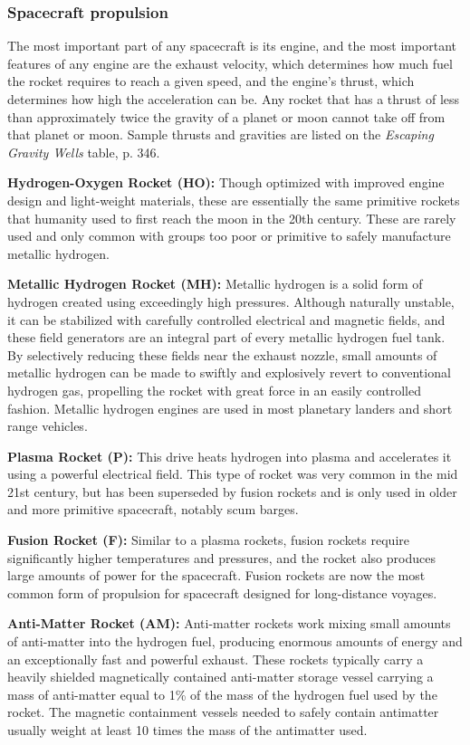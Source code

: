 \subsubsection{Spacecraft propulsion} 

The most important part of any spacecraft is its engine, and the most important features of any engine are the exhaust velocity, which determines how much fuel the rocket requires to reach a given speed, and the engine’s thrust, which determines how high the acceleration can be. Any rocket that has a thrust of less than approximately twice the gravity of a planet or moon cannot take off from that planet or moon. Sample thrusts and gravities are listed on the \emph{Escaping Gravity Wells} table, p. 346. 

\textbf{Hydrogen-Oxygen Rocket (HO):} Though optimized with improved engine design and light-weight materials, these are essentially the same primitive rockets that humanity used to first reach the moon in the 20th century. These are rarely used and only common with groups too poor or primitive to safely manufacture metallic hydrogen. 

\textbf{Metallic Hydrogen Rocket (MH):} Metallic hydrogen is a solid form of hydrogen created using exceedingly high pressures. Although naturally unstable, it can be stabilized with carefully controlled electrical and magnetic fields, and these field generators are an integral part of every metallic hydrogen fuel tank. By selectively reducing these fields near the exhaust nozzle, small amounts of metallic hydrogen can be made to swiftly and explosively revert to conventional hydrogen gas, propelling the rocket with great force in an easily controlled fashion. Metallic hydrogen engines are used in most planetary landers and short range vehicles. 

\textbf{Plasma Rocket (P):} This drive heats hydrogen into plasma and accelerates it using a powerful electrical field. This type of rocket was very common in the mid 21st century, but has been superseded by fusion rockets and is only used in older and more primitive spacecraft, notably scum barges. 

\textbf{Fusion Rocket (F):} Similar to a plasma rockets, fusion rockets require significantly higher temperatures and pressures, and the rocket also produces large amounts of power for the spacecraft. Fusion rockets are now the most common form of propulsion for spacecraft designed for long-distance voyages. 

\textbf{Anti-Matter Rocket (AM):} Anti-matter rockets work mixing small amounts of anti-matter into the hydrogen fuel, producing enormous amounts of energy and an exceptionally fast and powerful exhaust. These rockets typically carry a heavily shielded magnetically contained anti-matter storage vessel carrying a mass of anti-matter equal to 1\% of the mass of the hydrogen fuel used by the rocket. The magnetic containment vessels needed to safely contain antimatter usually weight at least 10 times the mass of the antimatter used. 

